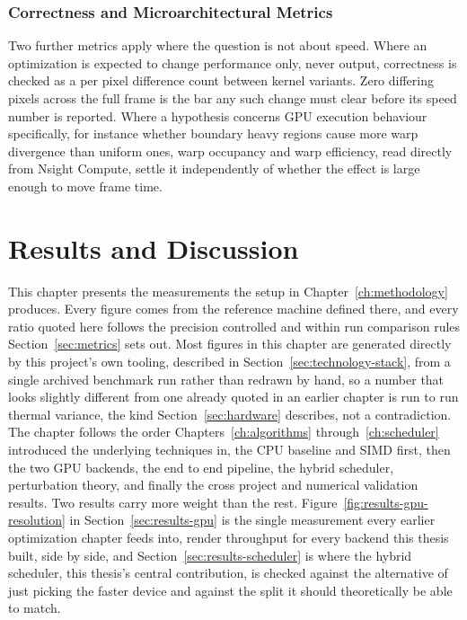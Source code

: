 \documentclass{ftndiplomski}
\begin{document}
\subsection{Correctness and Microarchitectural Metrics}
\label{sec:correctness-metrics}

Two further metrics apply where the question is not about speed. Where an
optimization is expected to change performance only, never output,
correctness is checked as a per pixel difference count between kernel
variants. Zero differing pixels across the full frame is the bar any such
change must clear before its speed number is reported. Where a hypothesis
concerns GPU execution behaviour specifically, for instance whether
boundary heavy regions cause more warp divergence than uniform ones, warp
occupancy and warp efficiency, read directly from Nsight Compute, settle
it independently of whether the effect is large enough to move frame
time.

\chapter{Results and Discussion}
\label{ch:results}

This chapter presents the measurements the setup in
Chapter~\ref{ch:methodology} produces. Every figure comes from the
reference machine defined there, and every ratio quoted here follows the
precision controlled and within run comparison rules
Section~\ref{sec:metrics} sets out. Most figures in this chapter are
generated directly by this project's own 
tooling, described in Section~\ref{sec:technology-stack}, from a single
archived benchmark run rather than redrawn by hand, so a number that
looks slightly different from one already quoted in an earlier chapter is
run to run thermal variance, the kind Section~\ref{sec:hardware}
describes, not a contradiction. The chapter follows the order
Chapters~\ref{ch:algorithms} through~\ref{ch:scheduler} introduced the
underlying techniques in, the CPU baseline and SIMD first, then the two
GPU backends, the end to end pipeline, the hybrid scheduler, perturbation
theory, and finally the cross project and numerical validation results.
Two results carry more weight than the rest. Figure~\ref{fig:results-gpu-resolution}
in Section~\ref{sec:results-gpu} is the single measurement every earlier
optimization chapter feeds into, render throughput for every backend this
thesis built, side by side, and Section~\ref{sec:results-scheduler} is
where the hybrid scheduler, this thesis's central contribution, is
checked against the alternative of just picking the faster device and
against the split it should theoretically be able to match.
\end{document}
